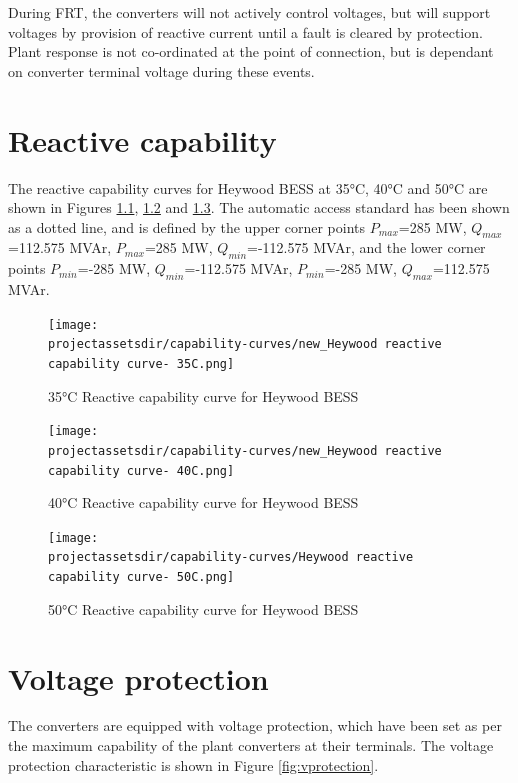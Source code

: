 \documentclass{../grid-link-report}
\newcommand{\projectassetsdir}{../project-assets}
\begin{document}
	During FRT, the converters will not actively control voltages, but will support voltages by provision of reactive current until a fault is cleared by protection. Plant response is not co-ordinated at the point of connection, but is dependant on converter terminal voltage during these events.

	\chapter{Reactive capability}
	The reactive capability curves for \ac{Heywood BESS} at 35°C, 40°C and 50°C are shown in Figures \ref{fig:pq-curve-35degC}, \ref{fig:pq-curve-40degC} and \ref{fig:pq-curve-50degC}. The automatic access standard has been shown as a dotted line, and is defined by the upper corner points $P_{max}$=285 MW, $Q_{max}$=112.575 MVAr, $P_{max}$=285 MW, $Q_{min}$=-112.575 MVAr, and the lower corner points $P_{min}$=-285 MW, $Q_{min}$=-112.575 MVAr, $P_{min}$=-285 MW, $Q_{max}$=112.575 MVAr.
	
	
	\begin{figure}[H]
		\centering
		\texttt{[image: \\projectassetsdir/capability-curves/new\_Heywood reactive capability curve- 35C.png]}
		\caption{35°C Reactive capability curve for Heywood BESS}
		\label{fig:pq-curve-35degC}
	\end{figure}
	
	\begin{figure}[H]
		\centering
		\texttt{[image: \\projectassetsdir/capability-curves/new\_Heywood reactive capability curve- 40C.png]}
		\caption{40°C Reactive capability curve for Heywood BESS}
		\label{fig:pq-curve-40degC}
	\end{figure}
	
	\begin{figure}[H]
		\centering
		\texttt{[image: \\projectassetsdir/capability-curves/Heywood reactive capability curve- 50C.png]}
		\caption{50°C Reactive capability curve for Heywood BESS}
		\label{fig:pq-curve-50degC}
	\end{figure}
	
	\chapter{Voltage protection}
	
	The converters are equipped with voltage protection, which have been set as per the maximum capability of the plant converters at their terminals. The voltage protection characteristic is shown in Figure \ref{fig:vprotection}.
	
\end{document}
